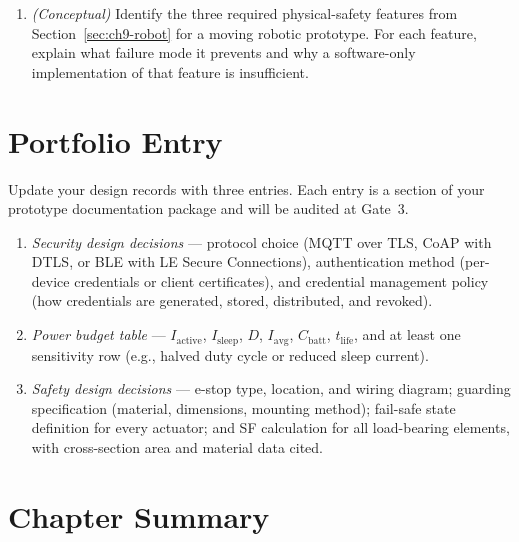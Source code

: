 \begin{enumerate}
  \item[Q5.] \textit{(Conceptual)} Identify the three required physical-safety
             features from Section~\ref{sec:ch9-robot} for a moving robotic
             prototype.
             For each feature, explain what failure mode it prevents and why a
             software-only implementation of that feature is insufficient.
\end{enumerate}

\section*{Portfolio Entry}
\label{sec:ch9-portfolio}

Update your design records with three entries.
Each entry is a section of your prototype documentation package and will be
audited at Gate~3.

\begin{enumerate}
  \item \textit{Security design decisions} --- protocol choice (MQTT over TLS,
        CoAP with DTLS, or BLE with LE Secure Connections), authentication method
        (per-device credentials or client certificates), and credential management
        policy (how credentials are generated, stored, distributed, and revoked).
  \item \textit{Power budget table} --- $I_{\text{active}}$, $I_{\text{sleep}}$,
        $D$, $I_{\text{avg}}$, $C_{\text{batt}}$, $t_{\text{life}}$, and at
        least one sensitivity row (e.g., halved duty cycle or reduced sleep current).
  \item \textit{Safety design decisions} --- e-stop type, location, and wiring
        diagram; guarding specification (material, dimensions, mounting method);
        fail-safe state definition for every actuator; and SF calculation for all
        load-bearing elements, with cross-section area and material data cited.
\end{enumerate}

\section*{Chapter Summary}
\label{sec:ch9-summary}

